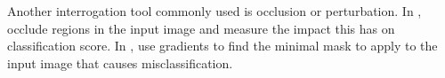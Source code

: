   Another interrogation tool commonly used is occlusion or perturbation.
  In \cite{zeiler_visualizing_2014}, \citeauthor{zeiler_visualizing_2014} occlude regions in the
  input image and measure the impact this has on classification score. In
  \cite{fong_interpretable_2017}, \citeauthor{fong_interpretable_2017} use
  gradients to find the minimal mask to apply to the input image that causes
  misclassification.

